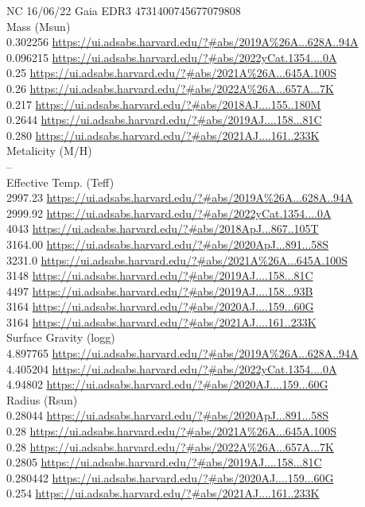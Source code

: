 NC 16/06/22
Gaia EDR3 4731400745677079808\\
Mass (Msun)\\
0.302256 \url{https://ui.adsabs.harvard.edu/?#abs/2019A%26A...628A..94A}\\
0.096215 \url{https://ui.adsabs.harvard.edu/?#abs/2022yCat.1354....0A}\\
0.25 \url{https://ui.adsabs.harvard.edu/?#abs/2021A%26A...645A.100S}\\
0.26 \url{https://ui.adsabs.harvard.edu/?#abs/2022A%26A...657A...7K}\\
0.217 \url{https://ui.adsabs.harvard.edu/?#abs/2018AJ....155..180M}\\
0.2644 \url{https://ui.adsabs.harvard.edu/?#abs/2019AJ....158...81C}\\
0.280 \url{https://ui.adsabs.harvard.edu/?#abs/2021AJ....161..233K}\\
Metalicity (M/H)\\
--\\
Effective Temp. (Teff)\\
2997.23 \url{https://ui.adsabs.harvard.edu/?#abs/2019A%26A...628A..94A}\\
2999.92 \url{https://ui.adsabs.harvard.edu/?#abs/2022yCat.1354....0A}\\
4043 \url{https://ui.adsabs.harvard.edu/?#abs/2018ApJ...867..105T}\\
3164.00 \url{https://ui.adsabs.harvard.edu/?#abs/2020ApJ...891...58S}\\
3231.0 \url{https://ui.adsabs.harvard.edu/?#abs/2021A%26A...645A.100S}\\
3148 \url{https://ui.adsabs.harvard.edu/?#abs/2019AJ....158...81C}\\
4497 \url{https://ui.adsabs.harvard.edu/?#abs/2019AJ....158...93B}\\
3164 \url{https://ui.adsabs.harvard.edu/?#abs/2020AJ....159...60G}\\
3164 \url{https://ui.adsabs.harvard.edu/?#abs/2021AJ....161..233K}\\
Surface Gravity (logg)\\
4.897765 \url{https://ui.adsabs.harvard.edu/?#abs/2019A%26A...628A..94A}\\
4.405204 \url{https://ui.adsabs.harvard.edu/?#abs/2022yCat.1354....0A}\\
4.94802 \url{https://ui.adsabs.harvard.edu/?#abs/2020AJ....159...60G}\\
Radius (Rsun)\\
0.28044 \url{https://ui.adsabs.harvard.edu/?#abs/2020ApJ...891...58S}\\
0.28 \url{https://ui.adsabs.harvard.edu/?#abs/2021A%26A...645A.100S}\\
0.28 \url{https://ui.adsabs.harvard.edu/?#abs/2022A%26A...657A...7K}\\
0.2805 \url{https://ui.adsabs.harvard.edu/?#abs/2019AJ....158...81C}\\
0.280442 \url{https://ui.adsabs.harvard.edu/?#abs/2020AJ....159...60G}\\
0.254 \url{https://ui.adsabs.harvard.edu/?#abs/2021AJ....161..233K}\\

